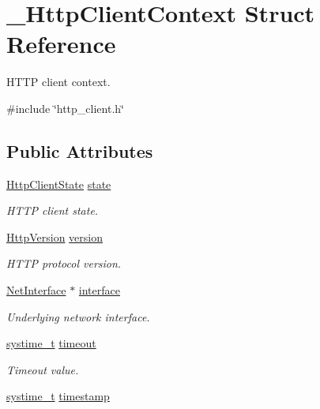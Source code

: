\hypertarget{struct__HttpClientContext}{}\section{\+\_\+\+Http\+Client\+Context Struct Reference}
\label{struct__HttpClientContext}


H\+T\+TP client context.  




{\ttfamily \#include \char`\"{}http\+\_\+client.\+h\char`\"{}}

\subsection*{Public Attributes}
\begin{DoxyCompactItemize}
\item 
\hyperlink{http__client_8h_a467beb99e0cff97a16b2ef23a0aaf8c5}{Http\+Client\+State} \hyperlink{struct__HttpClientContext_ab4710b3c68efc0249153457789738304}{state}
\begin{DoxyCompactList}\small\item\em H\+T\+TP client state. \end{DoxyCompactList}\item 
\hyperlink{http__common_8h_ac870fd261da652aee69937751c6f7e7f}{Http\+Version} \hyperlink{struct__HttpClientContext_a7b8619ae39d9b1b13ca1b4feef0c1441}{version}
\begin{DoxyCompactList}\small\item\em H\+T\+TP protocol version. \end{DoxyCompactList}\item 
\hyperlink{net_8h_a2234db8911a1148c9159979d8f5e0d6b}{Net\+Interface} $\ast$ \hyperlink{struct__HttpClientContext_a548b3ebd3e51ba4815c1ec4e7a3cc160}{interface}
\begin{DoxyCompactList}\small\item\em Underlying network interface. \end{DoxyCompactList}\item 
\hyperlink{compiler__port_8h_ae3e32a98d431a02106616da3071832dd}{systime\+\_\+t} \hyperlink{struct__HttpClientContext_a7c3a1625275db84fa6dcd6947d70e336}{timeout}
\begin{DoxyCompactList}\small\item\em Timeout value. \end{DoxyCompactList}\item 
\hyperlink{compiler__port_8h_ae3e32a98d431a02106616da3071832dd}{systime\+\_\+t} \hyperlink{struct__HttpClientContext_aa8c652b78a89b8349b845d9439e8a4b8}{timestamp}

\end{DoxyCompactItemize}
